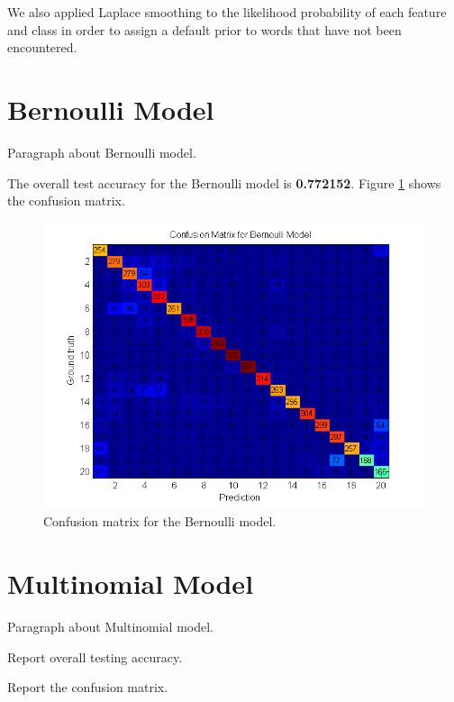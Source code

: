 \documentclass[12pt]{article}
\begin{document}
We also applied Laplace smoothing to the likelihood probability of each feature and class in order to assign a default prior to words that have not been encountered.

\section{Bernoulli Model}
Paragraph about Bernoulli model.

The overall test accuracy for the Bernoulli model is \textbf{0.772152}. Figure \ref{fig:confusionmat_bern} shows the confusion matrix.

\begin{figure}[!t]
  \centering
  \includegraphics[scale=1]{img/confusionmat_bern.png}
  \caption{Confusion matrix for the Bernoulli model.}
  \label{fig:confusionmat_bern}
\end{figure}

\section{Multinomial Model}

Paragraph about Multinomial model.

Report overall testing accuracy.

Report the confusion matrix.

%
\end{document}

